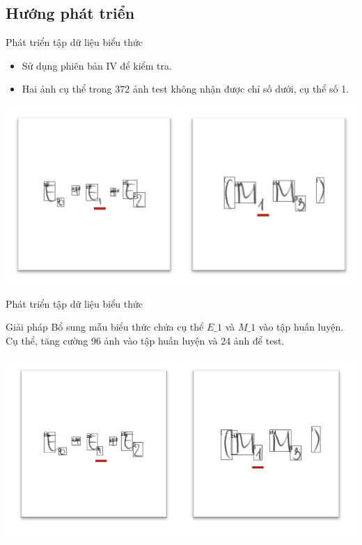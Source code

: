 \documentclass{beamer}
\begin{document}
	\subsection{Hướng phát triển}
	\begin{frame}{Phát triển tập dữ liệu biểu thức}
		\begin{itemize}
			\item Sử dụng phiên bản IV để kiểm tra.
			\item Hai ảnh cụ thể trong 372 ảnh test không nhận được chỉ số dưới, cụ thể số 1.
		\end{itemize}
		\begin{center}
			\centering
			\includegraphics[width=0.6\linewidth]{M1E1}
			\vspace{0.5cm}
			\label{fig: m1}
		\end{center}
	\end{frame}
	\begin{frame}{Phát triển tập dữ liệu biểu thức}
		\begin{block}{Giải pháp}
			Bổ sung mẫu biểu thức chứa cụ thể $E\_1$ và $M\_1$ vào tập huấn luyện. Cụ thể, tăng cường 96 ảnh vào tập huấn luyện và 24 ảnh để test.
		\end{block}
		\begin{center}
			\centering
			\includegraphics[width=0.7\linewidth]{M1E1_res}
			\vspace{0.5cm}
		\end{center}
	\end{frame}
	
\end{document}
